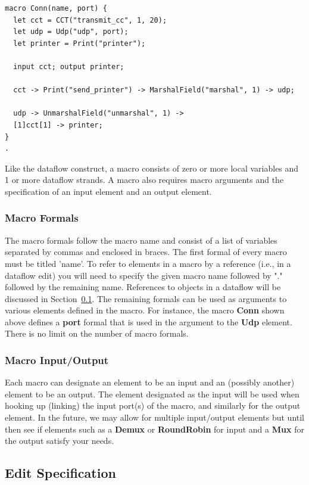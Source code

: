 \documentclass[12pt]{article}
\begin{document}
\begin{verbatim}
macro Conn(name, port) {
  let cct = CCT("transmit_cc", 1, 20);
  let udp = Udp("udp", port);
  let printer = Print("printer");
  
  input cct; output printer;
  
  cct -> Print("send_printer") -> MarshalField("marshal", 1) -> udp;

  udp -> UnmarshalField("unmarshal", 1) ->
  [1]cct[1] -> printer;
}
.
\end{verbatim}

Like the dataflow construct, a macro consists of zero or more local variables and
1 or more dataflow strands. A macro also requires macro arguments and the 
specification of an input element and an output element.

\subsubsection{Macro Formals}

The macro formals follow the macro name and consist of a list of 
variables separated by commas and enclosed in braces. The first formal
of every macro must be titled 'name'. To refer to elements in a macro by a 
reference (i.e., in a dataflow edit) you will need to specify the given macro name
followed by "." followed by the remaining name. References to objects in a 
dataflow will be discussed in Section~\ref{sec:edits}. The remaining formals
can be used as arguments to various elements defined in the macro. For instance,
the macro {\bf Conn} shown above defines a {\bf port} formal that is used in
the argument to the {\bf Udp} element. There is no limit on the number of macro formals. 

\subsubsection{Macro Input/Output}

Each macro can designate an element to be an input and an (possibly another) element
to be an output. The element designated as the input will be used when hooking up
(linking) the input port(s) of the macro, and similarly for the output element. In the 
future, we may allow for multiple input/output elements but until then see if
elements such as a {\bf Demux} or {\bf RoundRobin} for input and a {\bf Mux} for the 
output satisfy your needs. 

\subsection{Edit Specification}
\label{sec:edits}
\end{document}
